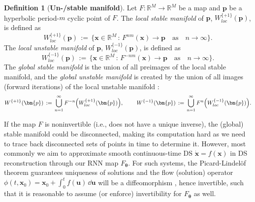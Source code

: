 \documentclass{article}
\theoremstyle{example}
\theoremstyle{plain}
\theoremstyle{definition}
\newtheorem{definition}{Definition}
\theoremstyle{remark}
\def\vp{{\bm{p}}}
\def\vx{{\bm{x}}}
\begin{document}
\begin{definition}[\textbf{Un-/stable manifold}]
Let $F : \mathbb{R}^M \to \mathbb{R}^M$ be a map and $\vp$ be a hyperbolic period-$m$ cyclic %
point of $F$. The \emph{local stable manifold} of $\vp$, %
$W_{loc}^{\{+1\}}(\vp)$, is defined as
\[ W_{loc}^{\{+1\}}(\vp) \, := \,  \{ \vx \in \mathbb{R}^M \, :\,
F^{nm}(\vx) \to \vp 
\quad \text{as} \quad n \to \infty \}.
\]
The \emph{local unstable manifold} of $\vp$, %
$W_{loc}^{\{-1\}}(\vp)$, is defined as
\[ W_{loc}^{\{-1\}}(\vp) \, := \,  \{ \vx \in \mathbb{R}^M \, :\,
F^{-nm}(\vx) \to \vp 
\quad \text{as} \quad n \to \infty \}.
\]
The \emph{global stable manifold} is the union of all preimages 
of the local stable manifold, and the \emph{global unstable manifold} is created by the union of all images (forward iterations) of the local unstable manifold \citep{pat2}:
\begin{align}\label{eq:manifolds}
 W^{\{+1\}}(\vp) \, := \, \bigcup_{n=1}^{\infty} F^{-n} \Big(  W_{loc}^{\{+1\}}(\vp)\Big),  \hspace{.8cm}
 W^{\{-1\}}(\vp) \, := \, \bigcup_{n=1}^{\infty} F^{n} \Big(  W_{loc}^{\{-1\}}(\vp)\Big).
\end{align}
\end{definition}

If the map $F$ is noninvertible (i.e., does not have a unique inverse), the (global) stable manifold could be disconnected, making its computation hard as we need to trace back disconnected sets of points in time to determine it. However, most commonly we aim to approximate smooth continuous-time DS $\dot{\vx}=f(\vx)$ in DS reconstruction through our RNN map $F_{\mathbf{\theta}}$. For such systems, the Picard-Lindelöf theorem guarantees uniqueness of solutions and the flow (solution) operator $\phi(t,\vx_0)=\vx_0+\int_{0}^{t}f(\bm{u})\,\dd \bm{u}$ will be a diffeomorphism \citep{per}, hence invertible, such that it is reasonable to assume (or enforce) invertibility for $F_{\mathbf{\theta}}$ as well.\\ 
\end{document}

